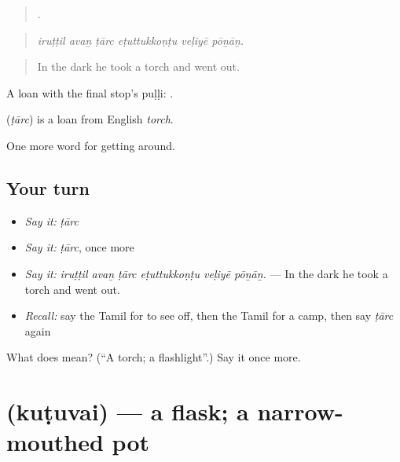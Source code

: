\begin{quote}
     .
\end{quote}

\begin{quote}
\emph{iruṭṭil avaṉ ṭārc eṭuttukkoṇṭu veḷiyē pōṉāṉ.}
\end{quote}

\begin{quote}
In the dark he took a torch and went out.
\end{quote}

A loan with the final stop's puḷḷi: .

\begin{cousinweb}
\textbf{} (\emph{ṭārc}) is a loan from English \emph{torch}.
\end{cousinweb}

\begin{grammarlens}[title={What you've built}]
One more word for getting around.
\end{grammarlens}

\subsection*{Your turn}
\begin{itemize}
\raggedright
  \item \emph{Say it:} \emph{ṭārc}
  \item \emph{Say it:} \emph{ṭārc}, once more
  \item \emph{Say it:} \emph{iruṭṭil avaṉ ṭārc eṭuttukkoṇṭu veḷiyē pōṉāṉ.} — In the dark he took a torch and went out.
  \item \emph{Recall:} say the Tamil for to see off, then the Tamil for a camp, then say \emph{ṭārc} again
\end{itemize}

\begin{tcolorbox}[breakable,colback=teal!4,colframe=teal!35!black,title={Before you move on}]
What does  mean? (\textquotedblleft{}A torch; a flashlight\textquotedblright{}.) Say it once more.
\end{tcolorbox}
\section[\texorpdfstring{\ta{குடுவை} (kuṭuvai)}{குடுவை (kuṭuvai)}]{ (kuṭuvai) — a flask; a narrow-mouthed pot}

\label{lesson:TA-C422-kutuvai}



